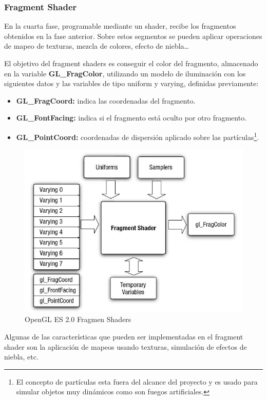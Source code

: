 \subsubsection{Fragment Shader}

En la cuarta fase, programable mediante un shader, recibe los fragmentos obtenidos en la fase anterior. Sobre estos segmentos se pueden aplicar operaciones de mapeo de texturas, mezcla de colores, efecto de niebla\ldots
\newline

El objetivo del fragment shaders es conseguir el color del fragmento, almacenado en la variable \textbf{GL\_FragColor}, utilizando un modelo de iluminación con los siguientes datos y las variables de tipo uniform y varying, definidas previamente:
\begin{itemize}
\item \textbf{GL\_FragCoord:} indica las coordenadas del fragmento.
\item \textbf{GL\_FontFacing:} indica si el fragmento está oculto por otro fragmento.
\item \textbf{ GL\_PointCoord:} coordenadas de dispersión aplicado sobre las partículas\footnote{El concepto de partículas esta fuera del alcance del proyecto y es usado para simular objetos muy dinámicos como son fuegos artificiales.}.
\end{itemize}

\begin{figure}[H]
\centering
\includegraphics[width=11.5cm]{img/FragmentShader.jpg}
\caption{OpenGL ES 2.0 Fragmen Shaders}
\end{figure}

Algunas de las características que pueden ser implementadas en el fragment shader son la aplicación de mapeos usando texturas, simulación de efectos de niebla, etc.

